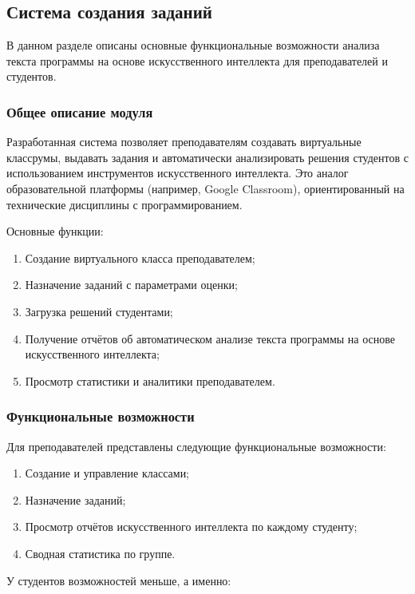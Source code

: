 \subsection{Система создания заданий}

В данном разделе описаны основные функциональные возможности анализа текста программы на основе искусственного интеллекта для преподавателей и студентов.

\subsubsection{Общее описание модуля}
Разработанная система позволяет преподавателям создавать виртуальные классрумы, выдавать задания и автоматически анализировать решения студентов с использованием инструментов искусственного интеллекта. Это аналог образовательной платформы (например, Google Classroom), ориентированный на технические дисциплины с программированием.

Основные функции:
\begin{enumerate}
  \item Создание виртуального класса преподавателем;
  \item Назначение заданий с параметрами оценки;
  \item Загрузка решений студентами;
  \item Получение отчётов об автоматическом анализе текста программы на основе искусственного интеллекта;
  \item Просмотр статистики и аналитики преподавателем.
\end{enumerate}

\subsubsection{Функциональные возможности}

Для преподавателей представлены следующие функциональные возможности: 

\begin{enumerate}
  \item Создание и управление классами;
  \item Назначение заданий;
  \item Просмотр отчётов искусственного интеллекта по каждому студенту;
  \item Сводная статистика по группе.
\end{enumerate}

У студентов возможностей меньше, а именно:

